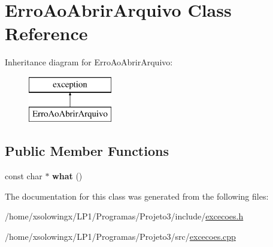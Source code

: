 \hypertarget{classErroAoAbrirArquivo}{}\section{Erro\+Ao\+Abrir\+Arquivo Class Reference}
\label{classErroAoAbrirArquivo}
Inheritance diagram for Erro\+Ao\+Abrir\+Arquivo\+:\begin{figure}[H]
\begin{center}
\leavevmode
\includegraphics[height=2.000000cm]{classErroAoAbrirArquivo}
\end{center}
\end{figure}
\subsection*{Public Member Functions}
\begin{DoxyCompactItemize}
\item 
\mbox{\label{classErroAoAbrirArquivo_a82ff15bef3608ab854b3621dedd25be8}} 
const char $\ast$ {\bfseries what} ()
\end{DoxyCompactItemize}


The documentation for this class was generated from the following files\+:\begin{DoxyCompactItemize}
\item 
/home/xsolowingx/\+L\+P1/\+Programas/\+Projeto3/include/\hyperlink{excecoes_8h}{excecoes.\+h}\item 
/home/xsolowingx/\+L\+P1/\+Programas/\+Projeto3/src/\hyperlink{excecoes_8cpp}{excecoes.\+cpp}\end{DoxyCompactItemize}
